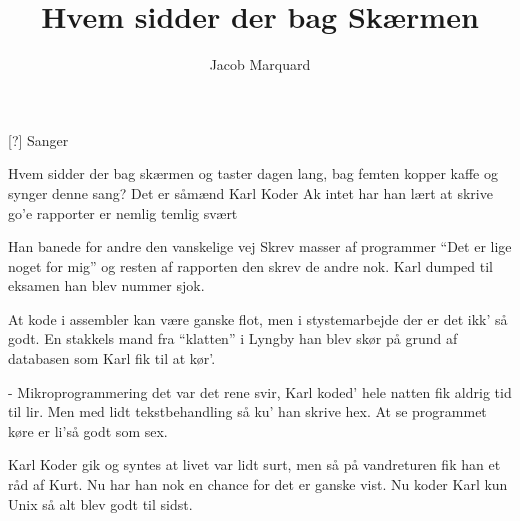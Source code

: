 \documentclass[a4paper,11pt]{article}
\title{Hvem sidder der bag Skærmen}
\author{Jacob Marquard}
\begin{document}
\maketitle

\begin{roles}
[?] Sanger
\end{roles}

\begin{song}

Hvem sidder der bag skærmen
og taster dagen lang,
bag femten kopper kaffe
og synger denne sang?
Det er såmænd Karl Koder
Ak intet har han lært
at skrive go'e rapporter
er nemlig temlig svært

Han banede for andre
den vanskelige vej
Skrev masser af programmer
``Det er lige noget for mig''
og resten af rapporten
den skrev de andre nok.
Karl dumped til eksamen
han blev nummer sjok.

At kode i assembler
kan være ganske flot,
men i stystemarbejde
der er det ikk' så godt.
En stakkels mand fra ``klatten''
i Lyngby han blev skør
på grund af databasen
som Karl fik til at kør'.

- Mikroprogrammering
det var det rene svir,
Karl koded' hele natten
fik aldrig tid til lir.
Men med lidt tekstbehandling
så ku' han skrive hex.
At se programmet køre
er li'så godt som sex.

Karl Koder gik og syntes
at livet var lidt surt,
men så på vandreturen
fik han et råd af Kurt.
Nu har han nok en chance
for det er ganske vist.
Nu koder Karl kun Unix
så alt blev godt til sidst.

\end{song}
\end{document}
